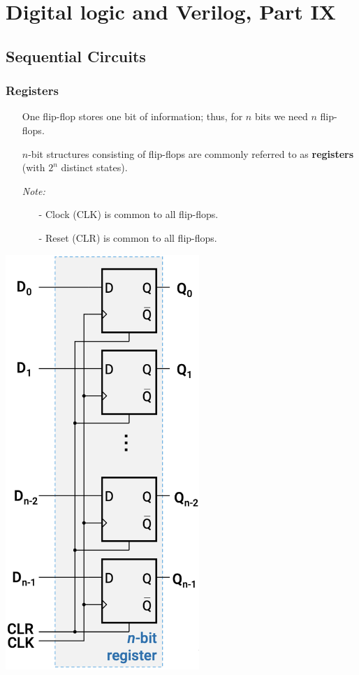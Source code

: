 \documentclass[12pt,openany]{book}
\begin{document}
\chapter{Digital logic and Verilog, Part IX}
\section{Sequential Circuits}
\subsection{Registers}

\begin{minipage}{0.4\textwidth}
	\small
\begin{itemize}
    \item[] One flip-flop stores one bit of information; thus, for \(n\) bits we need \(n\) flip-flops.
    \item[] \(n\)-bit structures consisting of flip-flops are commonly referred to as \textbf{registers} (with \(2^{n}\) distinct states).
    \item[] \textit{Note:}
    \begin{itemize}
        \item[-] Clock (CLK) is common to all flip-flops.
        \item[-] Reset (CLR) is common to all flip-flops.
    \end{itemize}
\end{itemize}
\end{minipage}
\hfill
\vline
\hfill
\begin{minipage}{0.5\textwidth}
\begin{center}	    
	\includegraphics[width=0.55\textwidth]{circuits/14.1.1.png}
	\footnotesize
\end{center}
\end{minipage}
\end{document}
